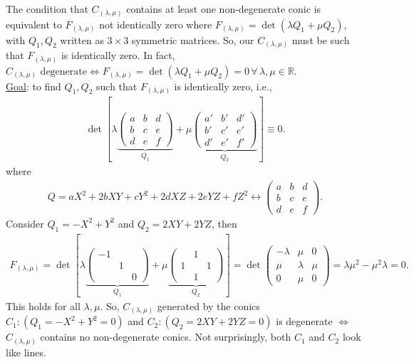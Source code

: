 \documentclass[12pt]{article}
\newcommand{\lb}{\left[}
\newcommand{\rb}{\right]}
\begin{document}
\noindent The condition that $C_{(\lambda,\mu)}$ contains at least one non-degenerate conic is equivalent to $F_{(\lambda,\mu)}$ not identically zero where
$F_{(\lambda,\mu)} = \det(\lambda Q_1 + \mu Q_2)$,
with $Q_1, Q_2$ written as $3\times 3$ symmetric matrices. So, our $C_{(\lambda,\mu)}$ must be such that $F_{(\lambda,\mu)}$ is identically zero. In fact, $C_{(\lambda,\mu)} \text{ degenerate} \iff F_{(\lambda,\mu)} = \det(\lambda Q_1 + \mu Q_2) = 0\, \forall \, \lambda,\mu \in \mathbb{R}$.\\

\noindent \underline{Goal}: to find $Q_1, Q_2$ such that $F_{(\lambda,\mu)}$ is identically zero, i.e.,
\begin{align*}
\det \lb \lambda \underbrace{\begin{pmatrix}
a&b&d\\b&c&e\\d&e&f
\end{pmatrix}}_{Q_1} 
+
\mu \underbrace{\begin{pmatrix}
a'&b'&d'\\b'&c'&e'\\d'&e'&f'
\end{pmatrix}}_{Q_2}\rb \equiv 0.
\end{align*}
where 
\begin{align*}
Q = aX^2 + 2bXY + cY^2 + 2dXZ + 2eYZ + fZ^2 \longleftrightarrow \begin{pmatrix}
a&b&d\\b&c&e\\d&e&f
\end{pmatrix}.
\end{align*}
Consider $Q_1 = -X^2 + Y^2$ and $Q_2 = 2XY + 2YZ$, then 
\begin{align*}
F_{(\lambda,\mu)} = \det 
\lb 
\lambda \underbrace{\begin{pmatrix}
-1&&\\&1&\\&&0
\end{pmatrix}}_{Q_1} 
+
\mu \underbrace{\begin{pmatrix}
&1&\\1&&1\\&1&
\end{pmatrix}}_{Q_2} 
\rb 
= \det \begin{pmatrix}
-\lambda & \mu & 0 \\\mu & \lambda & \mu \\ 0 & \mu & 0
\end{pmatrix} = \lambda \mu^2 - \mu^2 \lambda = 0.
\end{align*}
This holds for all $\lambda,\mu$. So, $C_{(\lambda,\mu)}$ generated by the conics $C_1:(Q_1 = -X^2 + Y^2=0)$ and $C_2: (Q_2 = 2XY + 2YZ =0) $ is degenerate $\iff$ $C_{(\lambda,\mu)}$ contains no non-degenerate conics. Not surprisingly, both $C_1$ and $C_2$ look like lines.     
\end{document}
